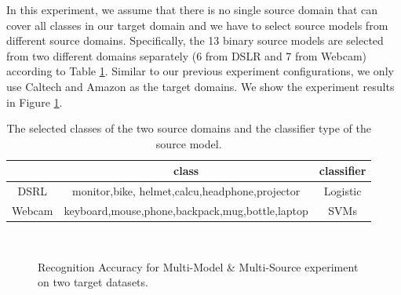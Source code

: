 In this experiment, we assume that there is no single source domain that can cover all classes in our target domain and we have to select source models from different source domains. Specifically, the 13 binary source models are selected from two different domains separately (6 from DSLR and 7 from Webcam) according to Table \ref{tab:class_gen}. Similar to our previous experiment configurations, we only use Caltech and Amazon as the target domains. We show the experiment results in Figure \ref{fig:exp2}.
\begin{table}[htbp]
	\centering
	\caption{The selected classes of the two source domains and the classifier type of the source model.}
	\begin{tabular}{|c|c|c|}
		\hline
		& class & classifier\\
		\hline
		DSRL& monitor,bike, helmet,calcu,headphone,projector & Logistic\\\hline
		Webcam&keyboard,mouse,phone,backpack,mug,bottle,laptop&SVMs\\ \hline
		
	\end{tabular}%
	\label{tab:class_gen}%
\end{table}%
\begin{figure}[th]
	\centering
	\qquad\qquad
	\\
	\caption{Recognition Accuracy for Multi-Model \& Multi-Source experiment on two target datasets. }
	\label{fig:exp2}
\end{figure}

